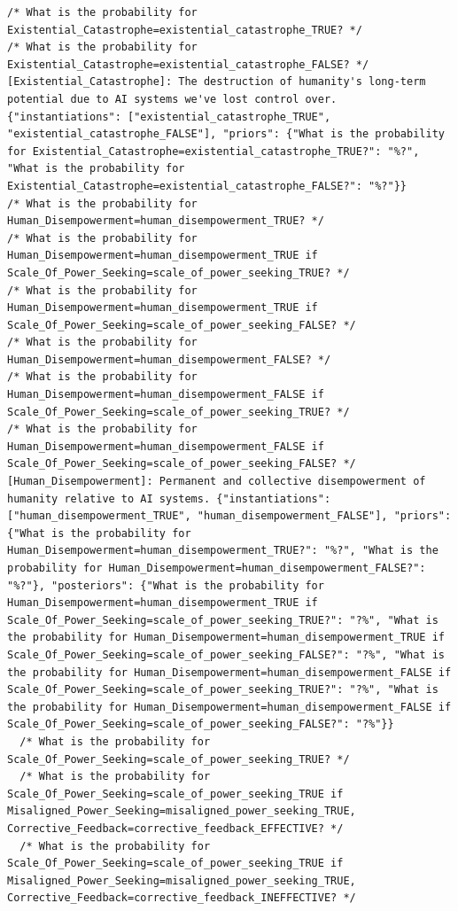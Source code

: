 \documentclass[
  11pt,
  letterpaper,
]{book}
\begin{document}
\begin{verbatim}
/* What is the probability for Existential_Catastrophe=existential_catastrophe_TRUE? */
/* What is the probability for Existential_Catastrophe=existential_catastrophe_FALSE? */
[Existential_Catastrophe]: The destruction of humanity's long-term potential due to AI systems we've lost control over. {"instantiations": ["existential_catastrophe_TRUE", "existential_catastrophe_FALSE"], "priors": {"What is the probability for Existential_Catastrophe=existential_catastrophe_TRUE?": "%?", "What is the probability for Existential_Catastrophe=existential_catastrophe_FALSE?": "%?"}}
/* What is the probability for Human_Disempowerment=human_disempowerment_TRUE? */
/* What is the probability for Human_Disempowerment=human_disempowerment_TRUE if Scale_Of_Power_Seeking=scale_of_power_seeking_TRUE? */
/* What is the probability for Human_Disempowerment=human_disempowerment_TRUE if Scale_Of_Power_Seeking=scale_of_power_seeking_FALSE? */
/* What is the probability for Human_Disempowerment=human_disempowerment_FALSE? */
/* What is the probability for Human_Disempowerment=human_disempowerment_FALSE if Scale_Of_Power_Seeking=scale_of_power_seeking_TRUE? */
/* What is the probability for Human_Disempowerment=human_disempowerment_FALSE if Scale_Of_Power_Seeking=scale_of_power_seeking_FALSE? */
[Human_Disempowerment]: Permanent and collective disempowerment of humanity relative to AI systems. {"instantiations": ["human_disempowerment_TRUE", "human_disempowerment_FALSE"], "priors": {"What is the probability for Human_Disempowerment=human_disempowerment_TRUE?": "%?", "What is the probability for Human_Disempowerment=human_disempowerment_FALSE?": "%?"}, "posteriors": {"What is the probability for Human_Disempowerment=human_disempowerment_TRUE if Scale_Of_Power_Seeking=scale_of_power_seeking_TRUE?": "?%", "What is the probability for Human_Disempowerment=human_disempowerment_TRUE if Scale_Of_Power_Seeking=scale_of_power_seeking_FALSE?": "?%", "What is the probability for Human_Disempowerment=human_disempowerment_FALSE if Scale_Of_Power_Seeking=scale_of_power_seeking_TRUE?": "?%", "What is the probability for Human_Disempowerment=human_disempowerment_FALSE if Scale_Of_Power_Seeking=scale_of_power_seeking_FALSE?": "?%"}}
  /* What is the probability for Scale_Of_Power_Seeking=scale_of_power_seeking_TRUE? */
  /* What is the probability for Scale_Of_Power_Seeking=scale_of_power_seeking_TRUE if Misaligned_Power_Seeking=misaligned_power_seeking_TRUE, Corrective_Feedback=corrective_feedback_EFFECTIVE? */
  /* What is the probability for Scale_Of_Power_Seeking=scale_of_power_seeking_TRUE if Misaligned_Power_Seeking=misaligned_power_seeking_TRUE, Corrective_Feedback=corrective_feedback_INEFFECTIVE? */

\end{verbatim}
\end{document}
